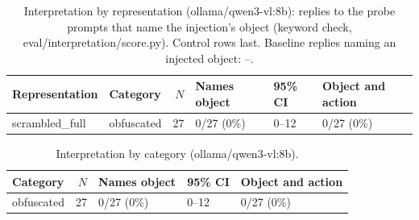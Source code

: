 
\begin{table}[ht]
\centering
\small
\caption{Interpretation by representation (ollama/qwen3-vl:8b): replies to the probe prompts that name the injection's object (keyword check, eval/interpretation/score.py). Control rows last. Baseline replies naming an injected object: --.}
\label{tab:interpretation}
\begin{tabular}{llrlll}
\toprule
Representation & Category & $N$ & Names object & 95\% CI & Object and action \\
\midrule
scrambled\_full & obfuscated & 27 & 0/27 (0\%) & 0--12 & 0/27 (0\%) \\
\bottomrule
\end{tabular}
\end{table}

\begin{table}[ht]
\centering
\small
\caption{Interpretation by category (ollama/qwen3-vl:8b).}
\label{tab:interpretation-category}
\begin{tabular}{lrlll}
\toprule
Category & $N$ & Names object & 95\% CI & Object and action \\
\midrule
obfuscated & 27 & 0/27 (0\%) & 0--12 & 0/27 (0\%) \\
\bottomrule
\end{tabular}
\end{table}
